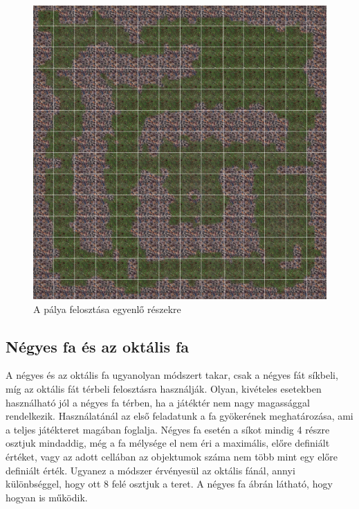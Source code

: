 \begin{figure}[h]
\centering
\includegraphics[scale=0.22]{kepek/grid.png}
\caption{A pálya felosztása egyenlő részekre}
\label{fig:grid}
\end{figure}

\subsection{Négyes fa és az oktális fa}

A négyes és az oktális fa ugyanolyan módszert takar, csak a négyes fát síkbeli, míg az oktális fát térbeli felosztásra használják. Olyan, kivételes esetekben használható jól a négyes fa térben, ha a játéktér nem nagy magassággal rendelkezik. Használatánál az első feladatunk a fa gyökerének meghatározása, ami a teljes játékteret magában foglalja. Négyes fa esetén a síkot mindig 4 részre osztjuk mindaddig, még a fa mélysége el nem éri a maximális, előre definiált értéket, vagy az adott cellában az objektumok száma nem több mint egy előre definiált érték. Ugyanez a módszer érvényesül az oktális fánál, annyi különbséggel, hogy ott 8 felé osztjuk a teret. A négyes fa  ábrán látható, hogy hogyan is működik.

